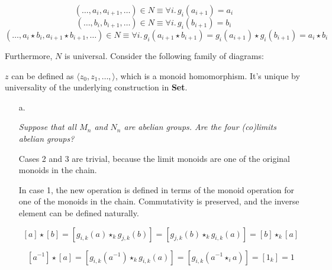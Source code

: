 \documentclass[a4paper,notitlepage]{article}
\begin{document}
\begin{enumerate}
\begin{itemize}
         $$(…, a_i, a_{i+1}, …) \in N \equiv \forall i .\, g_i(a_{i+1}) = a_i $$
         $$(…, b_i, b_{i+1}, …) \in N \equiv \forall i .\, g_i(b_{i+1}) = b_i $$
         $$(…, a_i \star b_i, a_{i+1} \star b_{i+1}, …) \in N \equiv \forall i.\, g_i(a_{i+1} \star b_{i+1}) = g_i(a_{i+1}) \star g_i(b_{i+1}) = a_i \star b_i$$


         Furthermore, $N$ is universal. Consider the following family of diagrams:

         

         $z$ can be defined as $\langle z_0, z_1, …, \rangle$, which is
         a monoid homomorphism. It's unique by universality of the
         underlying construction in {\bf Set}.

     \end{itemize}
     

     \begin{enumerate}

       \item[a.]

         {\em Suppose that all $M_n$ and $N_n$ are abelian groups.
           Are the four (co)limits abelian groups? }

         Cases 2 and 3 are trivial, because the limit monoids are
         one of the original monoids in the chain.

         In case 1, the new operation is defined in terms of the monoid
         operation for one of the monoids in the chain. Commutativity is
         preserved, and the inverse element can be defined naturally.

         $$[a] \star [b] = \left [ g_{i,k}(a) \star_k g_{j,k}(b) \right ] = \left [ g_{j,k}(b) \star_k g_{i,k}(a) \right ] = [b] \star_k [a]$$
         
         $$[a^{-1}] \star [a] = \left [ g_{i,k}(a^{-1}) \star_k g_{i,k}(a) \right ] = \left [ g_{i,k}(a^{-1} \star_i a) \right ] = [1_k] = 1$$
         

\end{enumerate}
\end{enumerate}
\end{document}
